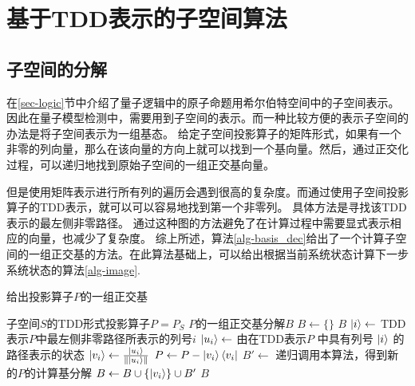 \section{基于TDD表示的子空间算法}
\subsection{子空间的分解}
在\ref{sec-logic}节中介绍了量子逻辑中的原子命题用希尔伯特空间中的子空间表示。
因此在量子模型检测中，需要用到子空间的表示。而一种比较方便的表示子空间的办法是将子空间表示为一组基态。
给定子空间投影算子的矩阵形式，如果有一个非零的列向量，那么在该向量的方向上就可以找到一个基向量。然后，通过正交化过程，可以递归地找到原始子空间的一组正交基向量。


但是使用矩阵表示进行所有列的遍历会遇到很高的复杂度。而通过使用子空间投影算子的TDD表示，就可以可以容易地找到第一个非零列。
具体方法是寻找该TDD表示的最左侧非零路径。
通过这种图的方法避免了在计算过程中需要显式表示相应的向量，也减少了复杂度​​。
综上所述，算法\ref{alg-basis_dec}给出了一个计算子空间的一组正交基的方法。在此算法基础上，可以给出根据当前系统状态计算下一步系统状态的算法\ref{alg-image}.
\begin{algorithm}
\caption{给出投影算子$P$的一组正交基}
\label{alg-basis_dec} 
\begin{algorithmic}[1]
    \Require 子空间$S$的TDD形式投影算子$P=P_S$ 
    \Ensure $P$的一组正交基分解$B$
    \State $B\gets \{\}$
        \Return \(B\)
    \Else
        \State \(\ket{i} \gets\) TDD表示\(P\)中最左侧非零路径所表示的列号\(i\)
        \State \(\ket{u_i}\gets\) 由在TDD表示\(P\) 中具有列号 \(\ket{i}\) 的路径表示的状态
        \State \(\ket{v_i} \gets \frac{\ket{u_i}}{\|\ket{u_i}\|}\)
        \State \(P \gets P - \ket{v_i}\bra{v_i}\)
        \State \(B' \gets \) 递归调用本算法，得到新的$P$的计算基分解
        \State \(B \gets B \cup \{\ket{v_i}\} \cup B'\)
    \EndIf
    \State \Return \(B\)
\end{algorithmic}
\end{algorithm}

